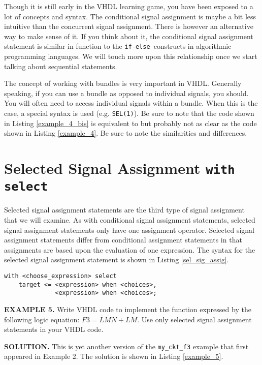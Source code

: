 Though it is still early in the VHDL learning game, you have been exposed to a lot of concepts and syntax. The conditional signal assignment is maybe a bit less intuitive than the concurrent signal assignment. There is however an alternative way to make sense of it. If you think about it, the conditional signal assignment statement is similar in function to the \texttt{if-else }constructs in algorithmic programming languages. We will touch more upon this relationship once we start talking about sequential statements.

The concept of working with bundles is very important in VHDL. Generally speaking, if you can use a bundle as opposed to individual signals, you should. You will often need to access individual signals within a bundle. When this is the case, a special syntax is used (e.g. \texttt{SEL(1)}). Be sure to note that the code shown in Listing \ref{example_4_bis} is equivalent to but probably not as clear as the code shown in Listing \ref{example_4}. Be sure to note the similarities and differences.

\section{Selected Signal Assignment \texttt{with select}}
Selected signal assignment statements are the third type of signal assignment that we will examine. As with conditional signal assignment statements, selected signal assignment statements only have one assignment operator. Selected signal assignment statements differ from conditional assignment statements in that assignments are based upon the evaluation of one expression. The syntax for the selected signal assignment statement is shown in Listing \ref{sel_sig_assig}.

\noindent
\begin{minipage}{0.99\linewidth}
\begin{lstlisting}[label=sel_sig_assig, caption=Syntax for the selected signal assignment statement.]
with <choose_expression> select
	target <= <expression> when <choices>,
	          <expression> when <choices>;
\end{lstlisting}
\end{minipage}

\begin{leftbar}
\noindent
\textbf{EXAMPLE 5.}
Write VHDL code to implement the function expressed by the following logic equation: $F3=\overline{L}\overline{M}N+LM$. Use only selected signal assignment statements in your VHDL code.
\end{leftbar}
\noindent
\textbf{SOLUTION.} This is yet another version of the \texttt{my\_ckt\_f3} example that first appeared in Example 2. The solution is shown in Listing \ref{example_5}.

